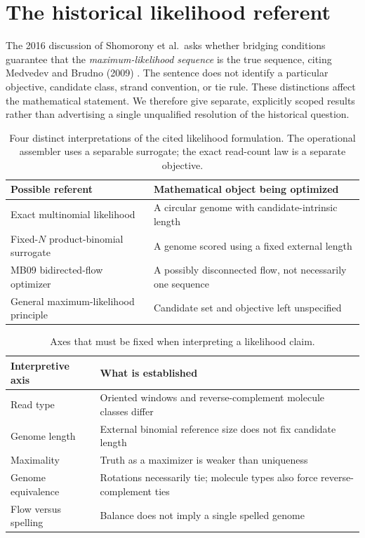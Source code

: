 \section{The historical likelihood referent}
\label{app:referents}

The 2016 discussion of Shomorony et al.\ asks whether bridging conditions
guarantee that the \emph{maximum-likelihood sequence} is the true sequence,
citing Medvedev and Brudno (2009)
\parencite{shomorony2016,medvedev2009}. The sentence does not identify a
particular objective, candidate class, strand convention, or tie rule.
These distinctions affect the mathematical statement. We therefore
give separate, explicitly scoped results rather than advertising a single
unqualified resolution of the historical question.

\begin{table}[htbp]
\centering\small
\begin{tabular}{@{}p{}p{}@{}}
\toprule
Possible referent & Mathematical object being optimized \\
\midrule
Exact multinomial likelihood & A circular genome with candidate-intrinsic length \\
Fixed-$N$ product-binomial surrogate & A genome scored using a fixed external length \\
MB09 bidirected-flow optimizer & A possibly disconnected flow, not necessarily one sequence \\
General maximum-likelihood principle & Candidate set and objective left unspecified \\
\bottomrule
\end{tabular}
\caption{Four distinct interpretations of the cited likelihood formulation.
The operational assembler uses a separable surrogate; the exact
read-count law is a separate objective.}
\label{tab:referents}
\end{table}

\begin{table}[htbp]
\centering\small
\begin{tabular}{@{}p{}p{}@{}}
\toprule
Interpretive axis & What is established \\
\midrule
Read type & Oriented windows and reverse-complement molecule classes differ \\
Genome length & External binomial reference size does not fix candidate length \\
Maximality & Truth as a maximizer is weaker than uniqueness \\
Genome equivalence & Rotations necessarily tie; molecule types also force reverse-complement ties \\
Flow versus spelling & Balance does not imply a single spelled genome \\
\bottomrule
\end{tabular}
\caption{Axes that must be fixed when interpreting a likelihood claim.}
\label{tab:axes}
\end{table}

